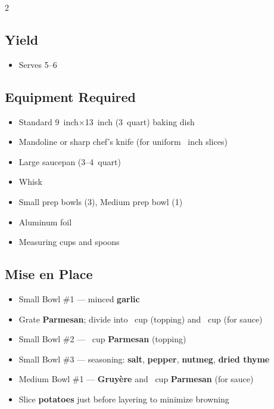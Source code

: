 \documentclass[11pt,letterpaper]{article}
\begin{document}
\newpage

{\footnotesize
\setlength{\columnsep}{20pt}
\setlength{\multicolsep}{6pt}
\begin{multicols}{2}
\setlength{\parindent}{0pt}
\setlength{\parskip}{2pt}
\setlength{\itemsep}{0pt}
\setlength{\parsep}{0pt}

\subsection*{Yield}
\begin{itemize}
    \item Serves 5--6
\end{itemize}

\subsection*{Equipment Required}
\begin{itemize}
    \item Standard 9~inch×13~inch (3~quart) baking dish
    \item Mandoline or sharp chef's knife (for uniform ~inch slices)
    \item Large saucepan (3--4~quart)
    \item Whisk
    \item Small prep bowls (3), Medium prep bowl (1)
    \item Aluminum foil
    \item Measuring cups and spoons
\end{itemize}

\subsection*{Mise en Place}
\begin{itemize}
    \item Small Bowl \#1 --- minced \textbf{garlic}
    \item Grate \textbf{Parmesan}; divide into ~cup (topping) and ~cup (for sauce)
    \item Small Bowl \#2 --- ~cup \textbf{Parmesan} (topping)
    \item Small Bowl \#3 --- seasoning: \textbf{salt}, \textbf{pepper}, \textbf{nutmeg}, \textbf{dried thyme}
    \item Medium Bowl \#1 --- \textbf{Gruyère} and ~cup \textbf{Parmesan} (for sauce)
    \item Slice \textbf{potatoes} just before layering to minimize browning
\end{itemize}


\end{multicols}}
\end{document}
